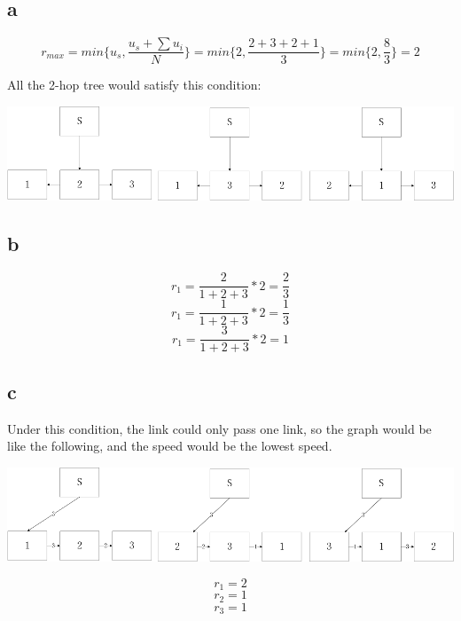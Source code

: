 \documentclass[12pt,a4paper]{article}
\begin{document}
\subsection{a}

\begin{equation}
r_{max} = min\{u_s, \frac{u_s+\sum{u_i}}{N}\} = min\{2, \frac{2+3+2+1}{3}\} = min\{2,\frac{8}{3}\} = 2
\end{equation}

All the 2-hop tree would satisfy this condition:

\includegraphics{PIC/embed-tree-a.png}

\subsection{b}
\begin{equation}
r_1 = \frac{2}{1+2+3} * 2 = \frac{2}{3}
\end{equation}
\begin{equation}
r_1 = \frac{1}{1+2+3} * 2 = \frac{1}{3}
\end{equation}
\begin{equation}
r_1 = \frac{3}{1+2+3} * 2 = 1
\end{equation}

\subsection{c}

Under this condition, the link could only pass one link, so the graph would be like the following, and the speed would be the lowest speed.

\includegraphics{PIC/embed-tree-c.png}

\begin{equation}
r_1 = 2
\end{equation}
\begin{equation}
r_2 = 1
\end{equation}
\begin{equation}
r_3 = 1
\end{equation}
\end{document}
